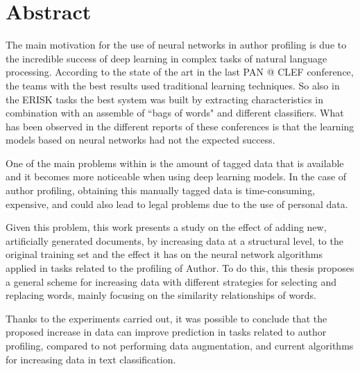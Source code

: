 \chapter{Abstract}

The main motivation for the use of neural networks in author profiling is due to the incredible success of deep learning in complex tasks of natural language processing. According to the state of the art in the last PAN @ CLEF conference, the teams with the best results used traditional learning techniques. So also in the ERISK tasks the best system was built by extracting characteristics in combination with an assemble of ``bags of words" and different classifiers. What has been observed in the different reports of these conferences is that the learning models based on neural networks had not the expected success.

One of the main problems within is the amount of tagged data that is available and it becomes more noticeable when using deep learning models. In the case of author profiling, obtaining this manually tagged data is time-consuming, expensive, and could also lead to legal problems due to the use of personal data.

Given this problem, this work presents a study on the effect of adding new, artificially generated documents, by increasing data at a structural level, to the original training set and the effect it has on the neural network algorithms applied in tasks related to the profiling of Author. To do this, this thesis proposes a general scheme for increasing data with different strategies for selecting and replacing words, mainly focusing on the similarity relationships of words.

Thanks to the experiments carried out, it was possible to conclude that the proposed increase in data can improve prediction in tasks related to author profiling, compared to not performing data augmentation, and current algorithms for increasing data in text classification.






